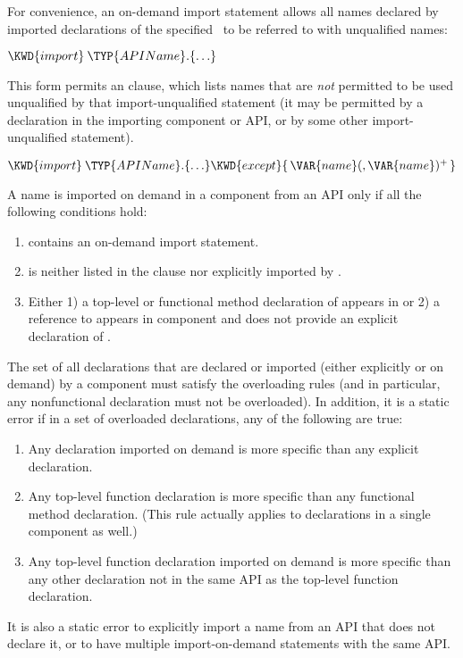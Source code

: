For convenience, an on-demand import statement
allows all names declared by imported declarations
of the specified \apiN\ to be referred to with unqualified names:
\begin{Fortress}
\(\KWD{import}\:\TYP{APIName}.\{\ldots\}\)
\end{Fortress}
This form permits an  clause,
which lists names that are \emph{not} permitted to be used unqualified
by that import-unqualified
statement
(it may be permitted by a declaration
in the importing component or API,
or by some other import-unqualified
statement).
\begin{Fortress}
\(\KWD{import}\:\TYP{APIName}.\{\ldots\} \KWD{except} \{\,\VAR{name} (, \VAR{name})^+\,\}\)
\end{Fortress}
A name  is imported on demand in a component 
from an API  only if all the following conditions hold:
\begin{enumerate}
\item {} contains an on-demand import statement.
\item {} is neither listed in the  clause
nor explicitly imported by .
\item Either 1) a top-level or functional method declaration of 
appears in  or 2) a reference to  appears in component 
and  does not provide an explicit declaration of .
\end{enumerate}

The set of all declarations that are declared or imported
(either explicitly or on demand) by a component must satisfy the overloading
rules (and in particular, any nonfunctional declaration must not be overloaded).
In addition, it is a static error if in a set of overloaded declarations,
any of the following are true:
\begin{enumerate}
\item Any declaration imported on demand is more specific than any explicit declaration.
\item Any top-level function declaration is more specific than any functional method declaration.
(This rule actually applies to declarations in a single component as well.)
\item
Any top-level function declaration imported on demand is more specific than any other declaration not in the same API as the top-level function declaration.
\end{enumerate}
It is also a static error to explicitly import a name from an API
that does not declare it, or to have multiple import-on-demand statements
with the same API.

